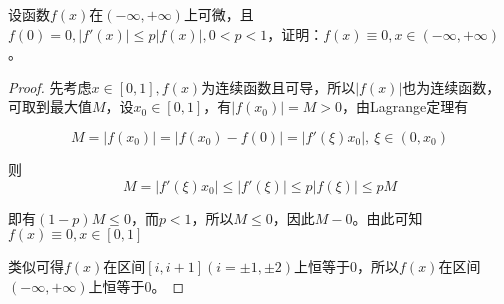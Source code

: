 \begin{problem}[思考题]
	设函数$f(x)$在$(-\infty,+\infty)$上可微，且$f(0)=0, \left|f'(x)\right|\leq p\left|f(x)\right|, 0<p<1$，证明：$f(x)\equiv 0,x\in (-\infty,+\infty)$。
	\begin{proof}
		先考虑$x\in [0,1],f(x)$为连续函数且可导，所以$\left|f(x)\right|$也为连续函数，可取到最大值$M$，设$x_0\in [0,1]$，有$\left|f(x_0)\right|=M>0$，由Lagrange定理有
		
		\[M=\left|f(x_0)\right|=\left|f(x_0) - f(0)\right|=\left|f'(\xi)x_0\right|,~\xi\in(0,x_0)\]
		
		则
		\[M=\left|f'(\xi)x_0\right|\leq \left|f'(\xi)\right|\leq p\left|f(\xi)\right|\leq pM\]
		
		即有$(1-p)M\leq 0$，而$p<1$，所以$M\leq 0$，因此$M-0$。由此可知$f(x)\equiv 0,x\in [0,1]$
		
		类似可得$f(x)$在区间$[i,i+1](i=\pm 1,\pm 2)$上恒等于0，所以$f(x)$在区间$(-\infty,+\infty)$上恒等于0。
	\end{proof}
\end{problem}